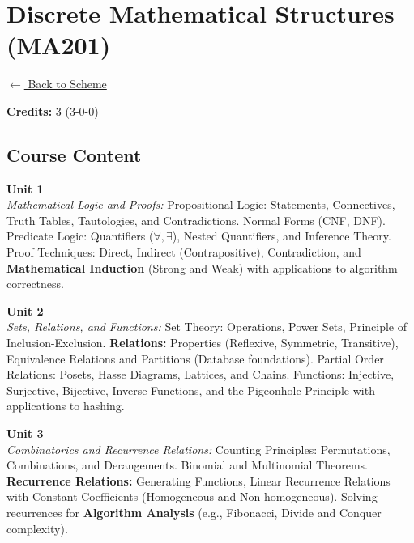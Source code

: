 \section*{Discrete Mathematical Structures (MA201)}
\label{course:MA201}

\noindent \small{\hyperref[main:scheme]{$\leftarrow$ Back to Scheme}} \vspace{0.5cm}

\noindent \textbf{Credits:} 3 (3-0-0)

\subsection*{Course Content}
\noindent\textbf{Unit 1} \\
\textit{Mathematical Logic and Proofs:} Propositional Logic: Statements, Connectives, Truth Tables, Tautologies, and Contradictions. Normal Forms (CNF, DNF). Predicate Logic: Quantifiers ($\forall, \exists$), Nested Quantifiers, and Inference Theory. Proof Techniques: Direct, Indirect (Contrapositive), Contradiction, and \textbf{Mathematical Induction} (Strong and Weak) with applications to algorithm correctness.

\vspace{0.3cm}

\noindent\textbf{Unit 2} \\
\textit{Sets, Relations, and Functions:} Set Theory: Operations, Power Sets, Principle of Inclusion-Exclusion. \textbf{Relations:} Properties (Reflexive, Symmetric, Transitive), Equivalence Relations and Partitions (Database foundations). Partial Order Relations: Posets, Hasse Diagrams, Lattices, and Chains. Functions: Injective, Surjective, Bijective, Inverse Functions, and the Pigeonhole Principle with applications to hashing.

\vspace{0.3cm}

\noindent\textbf{Unit 3} \\
\textit{Combinatorics and Recurrence Relations:} Counting Principles: Permutations, Combinations, and Derangements. Binomial and Multinomial Theorems. \textbf{Recurrence Relations:} Generating Functions, Linear Recurrence Relations with Constant Coefficients (Homogeneous and Non-homogeneous). Solving recurrences for \textbf{Algorithm Analysis} (e.g., Fibonacci, Divide and Conquer complexity).

\vspace{0.3cm}

